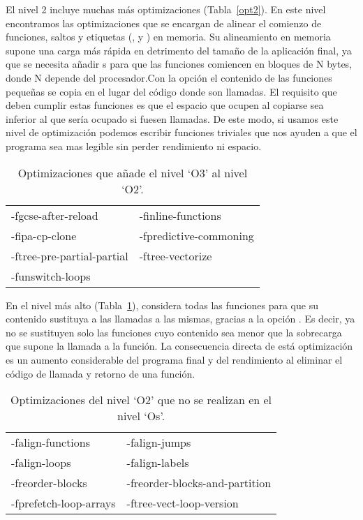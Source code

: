 El nivel 2 incluye muchas más optimizaciones (Tabla~\ref{opt2}). En este nivel encontramos las optimizaciones  que se encargan de alinear el comienzo de funciones, saltos y etiquetas (,  y ) en memoria. Su alineamiento en memoria supone una carga más rápida en detrimento del tamaño de la aplicación final, ya que se necesita añadir s para que las funciones comiencen en bloques de N bytes, donde N depende del procesador.Con la opción  el contenido de las funciones pequeñas se copia en el lugar del código donde son llamadas. El requisito que deben cumplir estas funciones es que el espacio que ocupen al copiarse sea inferior al que sería ocupado si fuesen llamadas. De este modo, si usamos este nivel de optimización podemos escribir funciones triviales que nos ayuden a que el programa sea mas legible sin perder rendimiento ni espacio.

\begin{table}[htb]
\begin{center}
	\begin{tabular}{ll}
		-fgcse-after-reload & -finline-functions\\
		-fipa-cp-clone & -fpredictive-commoning\\
		-ftree-pre-partial-partial & -ftree-vectorize\\
		-funswitch-loops & \\
	\end{tabular}
\end{center}
\caption{Optimizaciones que añade el nivel `O3' al nivel `O2'.}
\label{opt3}
\end{table}

En el nivel más alto (Tabla~\ref{opt3}),  considera todas las funciones para que su contenido sustituya a las llamadas a las mismas, gracias a la opción . Es decir, ya no se sustituyen solo las funciones cuyo contenido sea menor que la sobrecarga que supone la llamada a la función. La consecuencia directa de está optimización es un aumento considerable del programa final y del rendimiento al eliminar el código de llamada y retorno de una función. 

\begin{table}[htb]
\begin{center}
	\begin{tabular}{ll}
		-falign-functions & -falign-jumps\\
		-falign-loops & -falign-labels\\
		-freorder-blocks & -freorder-blocks-and-partition\\
		-fprefetch-loop-arrays & -ftree-vect-loop-version\\
\end{tabular}
\end{center}
\caption{Optimizaciones del nivel `O2' que no se realizan en el nivel `Os'.}
\label{opt_s}
\end{table}

